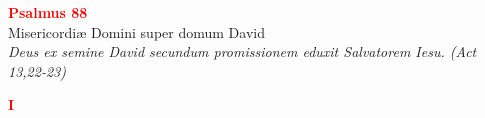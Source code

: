


\def\greinitialformat#1{%
{\fontsize{39}{39}\selectfont #1}%
}




\vspace{0.3cm}
\begin{center}
 \textcolor{red}{\large \bf Psalmus 88}\\
Misericordiæ Domini super domum David\\
\textit{\small Deus ex semine David secundum promissionem eduxit Salvatorem Iesu. (Act 13,22-23)}
\end{center}
\begin{center}
\textcolor{red}{\bf I}
\end{center}
